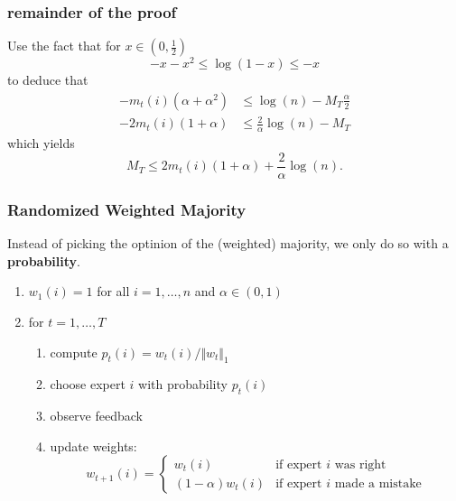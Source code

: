 \documentclass{beamer}
\begin{document}
%
\begin{frame}
  \frametitle{remainder of the proof}
  Use the fact that for $x\in (0,\frac12)$
  \begin{equation}
    -x -x^2 \le \log(1-x) \le -x
  \end{equation}
  to deduce that
  \begin{equation}
    \begin{aligned}
    - m_t(i) (\alpha+\alpha^2) &\le \log(n) - M_T \frac{\alpha}{2} \\
    -2 m_t(i) (1+\alpha) &\le \frac{2}{\alpha}\log(n) - M_T
    \end{aligned}
  \end{equation}
  which yields
  \begin{equation}
    M_T  \le 2 m_t(i) (1+\alpha) + \frac{2}{\alpha}\log(n).
  \end{equation}
\end{frame}


\begin{frame}
  \frametitle{Randomized Weighted Majority}

  Instead of picking the optinion of the (weighted) majority, we only do so with a \textbf{probability}.

  \begin{enumerate}
    \item $w_1(i) = 1$ for all $i = 1, \dots, n$ and $\alpha \in (0, 1)$
    \item for $t=1, \dots, T$
      \begin{enumerate}
      \item compute $p_t(i) = w_t(i)/\Vert w_t \Vert_1$
      \item choose expert $i$ with probability $p_t(i)$
      \item observe feedback
      \item update weights:
        \begin{equation}
          w_{t+1}(i) = \begin{cases}
              w_t(i) & \text{if expert $i$ was right} \\
              (1-\alpha)w_t(i) & \text{if expert $i$ made a mistake}
          \end{cases}
        \end{equation}

      \end{enumerate}
  \end{enumerate}

\end{frame}
\end{document}
